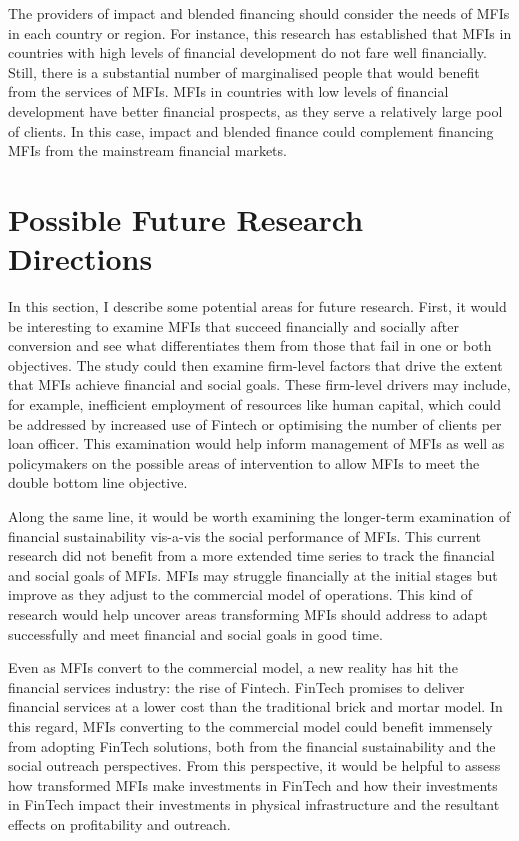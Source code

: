 \documentclass[a4paper, nobind]{templates/ociamthesis}
\begin{document}
The providers of impact and blended financing should consider the needs of MFIs in each country or region. For instance, this research has established that MFIs in countries with high levels of financial development do not fare well financially. Still, there is a substantial number of marginalised people that would benefit from the services of MFIs. MFIs in countries with low levels of financial development have better financial prospects, as they serve a relatively large pool of clients. In this case, impact and blended finance could complement financing MFIs from the mainstream financial markets.

\hypertarget{possible-future-research-directions}{%
\section{Possible Future Research Directions}\label{possible-future-research-directions}}

In this section, I describe some potential areas for future research. First, it would be interesting to examine MFIs that succeed financially and socially after conversion and see what differentiates them from those that fail in one or both objectives. The study could then examine firm-level factors that drive the extent that MFIs achieve financial and social goals. These firm-level drivers may include, for example, inefficient employment of resources like human capital, which could be addressed by increased use of Fintech or optimising the number of clients per loan officer. This examination would help inform management of MFIs as well as policymakers on the possible areas of intervention to allow MFIs to meet the double bottom line objective.

Along the same line, it would be worth examining the longer-term examination of financial sustainability vis-a-vis the social performance of MFIs. This current research did not benefit from a more extended time series to track the financial and social goals of MFIs. MFIs may struggle financially at the initial stages but improve as they adjust to the commercial model of operations. This kind of research would help uncover areas transforming MFIs should address to adapt successfully and meet financial and social goals in good time.

Even as MFIs convert to the commercial model, a new reality has hit the financial services industry: the rise of Fintech. FinTech promises to deliver financial services at a lower cost than the traditional brick and mortar model. In this regard, MFIs converting to the commercial model could benefit immensely from adopting FinTech solutions, both from the financial sustainability and the social outreach perspectives. From this perspective, it would be helpful to assess how transformed MFIs make investments in FinTech and how their investments in FinTech impact their investments in physical infrastructure and the resultant effects on profitability and outreach.
\end{document}
